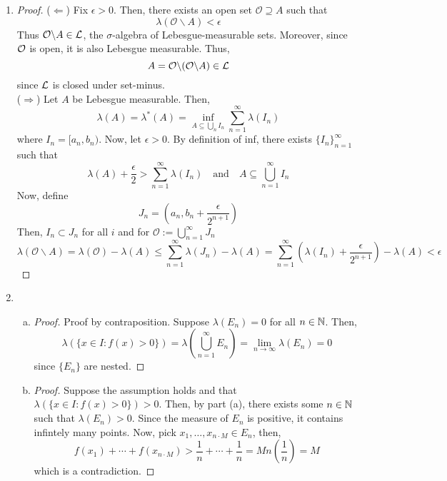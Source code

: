 \begin{enumerate}
\item \begin{proof}
	($\Leftarrow$) Fix $\epsilon >0$. Then, there exists an open set $\mathcal{O} \supseteq A$ such that
				\[ \lambda(\mathcal{O} \backslash A) < \epsilon \]
		Thus $\mathcal{O}\backslash A \in \mathcal{L}$, the $\sigma$-algebra of Lebesgue-measurable sets. Moreover, since $\mathcal{O}$ is open, it is also Lebesgue measurable. Thus,
			\[ A = \mathcal{O} \backslash (\mathcal{O} \backslash A) \in \mathcal{L}\]
		since $\mathcal{L}$ is closed under set-minus.\\
	($\Rightarrow$) Let $A$ be Lebesgue measurable. Then,
		\[ \lambda(A) = \lambda^*(A) = \inf_{A \subseteq \bigcup\limits_n I_n} \sum_{n=1}^\infty \lambda(I_n) \]
	where $I_n = [a_n,b_n)$. Now, let $\epsilon >0$. By definition of inf, there exists $\{I_n\}_{n=1}^\infty$ such that
		\[ \lambda(A) +\dfrac \epsilon 2 > \sum_{n=1}^\infty \lambda(I_n) \quad \text{and} \quad A \subseteq \bigcup_{n=1}^\infty I_n \]
	Now, define
		\[ J_n = \left(a_n,b_n+\dfrac \epsilon {2^{n+1}} \right) \]
	Then, $I_n \subset J_n$ for all $i$ and for $\mathcal{O} := \bigcup\limits_{n=1}^\infty J_n$
		\[ \lambda(\mathcal{O}\backslash A) = \lambda(\mathcal{O})-\lambda(A)\le \sum_{n=1}^\infty \lambda(J_n) - \lambda(A) = \sum_{n=1}^\infty \left(\lambda(I_n)+\dfrac{\epsilon}{2^{n+1}} \right) - \lambda(A) < \epsilon \]

	
\end{proof}

\item 
	\begin{enumerate}[(a)]
		\item \begin{proof}
			Proof by contraposition. Suppose $\lambda(E_n)=0$ for all $n \in \mathbb{N}$. Then,
				\[ \lambda\left(\{x \in I: f(x) >0 \}\right) = \lambda \left( \bigcup_{n=1}^\infty E_n \right) = \lim_{n\to\infty} \lambda(E_n) = 0 \]
			since $\{E_n\}$ are nested. 
		\end{proof}
	
		\item \begin{proof}
			Suppose the assumption holds and that $\lambda\left(\{x \in I: f(x) >0 \}\right) >0$. Then, by part (a), there exists some $n \in \mathbb{N}$ such that $\lambda(E_n) >0$. Since the measure of $E_n$ is positive, it contains infintely many points. Now, pick $x_1,\ldots,x_{n\cdot M} \in E_n$, then,
		\[ f(x_1) + \cdots + f(x_{n \cdot M}) > \dfrac 1n + \cdots + \dfrac 1n = Mn\left(\dfrac 1n\right) = M \]
which is a contradiction.
		\end{proof}
	\end{enumerate}


\end{enumerate}
